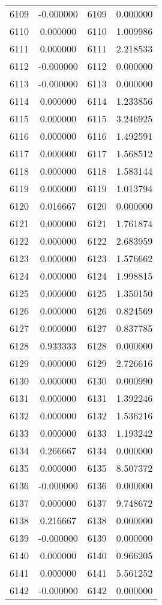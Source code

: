 \documentclass[12pt]{article}
\begin{document}
\begin{longtable}{@{}cccc@{}}
6109 & -0.000000 & 6109 & 0.000000 \\
6110 & 0.000000 & 6110 & 1.009986 \\
6111 & 0.000000 & 6111 & 2.218533 \\
6112 & -0.000000 & 6112 & 0.000000 \\
6113 & -0.000000 & 6113 & 0.000000 \\
6114 & 0.000000 & 6114 & 1.233856 \\
6115 & 0.000000 & 6115 & 3.246925 \\
6116 & 0.000000 & 6116 & 1.492591 \\
6117 & 0.000000 & 6117 & 1.568512 \\
6118 & 0.000000 & 6118 & 1.583144 \\
6119 & 0.000000 & 6119 & 1.013794 \\
6120 & 0.016667 & 6120 & 0.000000 \\
6121 & 0.000000 & 6121 & 1.761874 \\
6122 & 0.000000 & 6122 & 2.683959 \\
6123 & 0.000000 & 6123 & 1.576662 \\
6124 & 0.000000 & 6124 & 1.998815 \\
6125 & 0.000000 & 6125 & 1.350150 \\
6126 & 0.000000 & 6126 & 0.824569 \\
6127 & 0.000000 & 6127 & 0.837785 \\
6128 & 0.933333 & 6128 & 0.000000 \\
6129 & 0.000000 & 6129 & 2.726616 \\
6130 & 0.000000 & 6130 & 0.000990 \\
6131 & 0.000000 & 6131 & 1.392246 \\
6132 & 0.000000 & 6132 & 1.536216 \\
6133 & 0.000000 & 6133 & 1.193242 \\
6134 & 0.266667 & 6134 & 0.000000 \\
6135 & 0.000000 & 6135 & 8.507372 \\
6136 & -0.000000 & 6136 & 0.000000 \\
6137 & 0.000000 & 6137 & 9.748672 \\
6138 & 0.216667 & 6138 & 0.000000 \\
6139 & -0.000000 & 6139 & 0.000000 \\
6140 & 0.000000 & 6140 & 0.966205 \\
6141 & 0.000000 & 6141 & 5.561252 \\
6142 & -0.000000 & 6142 & 0.000000 \\

\end{longtable}
\end{document}
